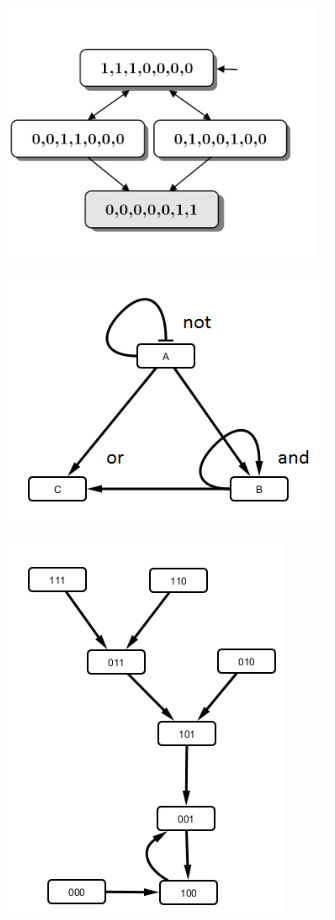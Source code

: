 \documentclass{beamer}
\begin{document}
\begin{frame}
\includegraphics[scale=0.5]{gen2.png}
\end{frame}

\begin{frame}
\includegraphics[scale=0.5]{automaton1.png}
\end{frame}

\begin{frame}
\includegraphics[scale=0.5]{automaton2.png}
\end{frame}
\end{document}
